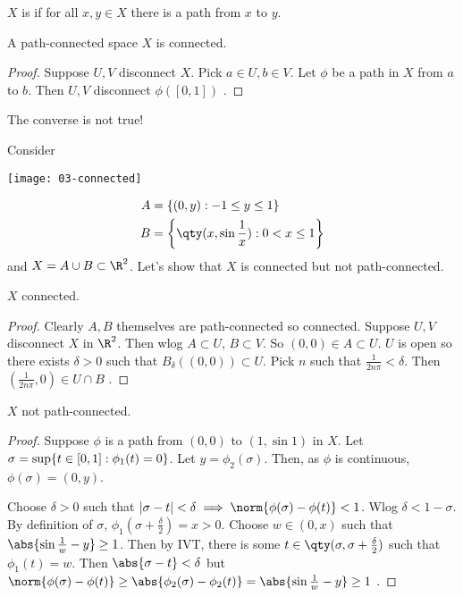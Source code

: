 \begin{definition}
    $X$ is  if for all $x,y\in X$ there is a path from $x$ to $y$.
\end{definition}

\begin{proposition} \label{prp:46}
    A path-connected space $X$ is connected.
\end{proposition}

\begin{proof}
    Suppose $U,V$ disconnect $X$. Pick $a\in U, b\in V$. Let $\phi$ be a path in $X$ from $a$ to $b$. Then $U,V$ disconnect $\phi([0,1])$ \Lightning.
\end{proof}

\begin{warning}
    The converse is not true!
\end{warning}

\begin{example}
Consider
{\par
\centering
\texttt{[image: 03-connected]}
\par}
\begin{align*}
    A &= \Set{(0,y)}{-1\leq y \leq 1} \\
    B &= \left\{ \qty(x,\sin \frac{1}{x}) : 0< x\leq 1 \right\}
\end{align*}
and $X = A\cup B \subset \R^2$. Let's show that $X$ is connected but not path-connected.
\end{example}

\begin{claim}
    $X$ connected.
\end{claim}

\begin{proof}
    Clearly $A,B$ themselves are path-connected so connected.
    Suppose $U,V$ disconnect $X$ in $\R^2$.
    Then wlog $A\subset U$, $B\subset V$.
    So $(0,0)\in A\subset U$. $U$ is open so there exists $\delta>0$ such that $B_\delta((0,0))\subset U$.
    Pick $n$ such that $\frac{1}{2n\pi}<\delta$. Then $(\frac{1}{2n\pi},0)\in U\cap B$ \Lightning.
\end{proof}

\begin{claim}
    $X$ not path-connected.
\end{claim}

\begin{proof}
    Suppose $\phi$ is a path from $(0,0)$ to $(1,\sin 1)$ in $X$.
    Let $\sigma = \sup\{t\in [0,1] : \phi_1(t) = 0\}$.
    Let $y = \phi_2(\sigma)$.
    Then, as $\phi$ is continuous, $\phi(\sigma) = (0,y)$.

    Choose $\delta > 0$ such that $|\sigma - t| <\delta \implies \norm{\phi(\sigma) - \phi(t)} < 1$.
    Wlog $\delta < 1-\sigma$. By definition of $\sigma$, $\phi_1(\sigma + \frac{\delta}{2}) = x > 0$.
    Choose $w\in (0,x)$ such that $\abs{\sin \frac{1}{w} - y} \geq 1$.
    Then by IVT, there is some $t\in \qty(\sigma, \sigma +\frac{\delta}{2})$ such that $\phi_1(t) = w$. Then $\abs{\sigma - t} < \delta$ but $\norm{\phi(\sigma) - \phi(t)} \geq \abs{\phi_2(\sigma) - \phi_2(t)} = \abs{\sin\frac{1}{w} - y} \geq 1$ \Lightning.
\end{proof}

